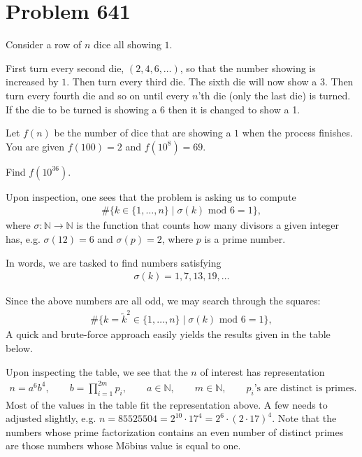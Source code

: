 \documentclass[main.tex]{subfiles}
\begin{document}
 
\section{Problem 641}

\begin{mdframed}[backgroundcolor = lightgray!10]
Consider a row of $n$ dice all showing $1$.

First turn every second die, $(2, 4, 6, \dots)$, so that the number showing is increased by $1$. Then turn every third die. The sixth die will now show a $3$. Then turn every fourth die and so on until every $n$'th die (only the last die) is turned. If the die to be turned is showing a 6 then it is changed to show a 1.

Let $f(n)$ be the number of dice that are showing a $1$ when the process finishes. You are given $f(100) = 2$ and $f(10^8) = 69$.


Find $f(10^{36})$.
\end{mdframed}

Upon inspection, one sees that the problem is asking us to compute
%
\begin{align}
 \# \{ k \in \{1, \dots, n \} \mid
 \sigma(k) \text{ mod } 6 = 1\},
\end{align}
%
where $\sigma: \mathbb N \to \mathbb N$ is the function that counts how many divisors a given integer has, e.g. $\sigma(12) = 6$ and $\sigma(p) = 2$, where $p$ is a prime number. 

In words, we are tasked to find numbers satisfying 
%
\begin{align}
 \sigma(k) = 1, 7, 13, 19, \dots
\end{align}

Since the above numbers are all odd, we may search through the squares:
%
\begin{align}
 \# \{ k = \widetilde k^2 \in \{1, \dots, n \} \mid
 \sigma(k) \text{ mod } 6 = 1\},
\end{align}
%
A quick and brute-force approach easily yields the results given in the table below. 

Upon inspecting the table, we see that the $n$ of interest has representation
%
\begin{align}
 n = a^6 b^4,
 \qquad b = \prod_{i=1}^{2m} p_i,
 \qquad a \in \mathbb N,
 \qquad m \in \mathbb N,
 \qquad p_i\text{'s are distinct is primes}.
\end{align}
%
Most of the values in the table fit the representation above. A few needs to adjusted slightly, e.g. $n = 85525504 = 2^{10} \cdot 17^4 = 2^6 \cdot (2 \cdot 17)^4$. Note that the numbers whose prime factorization contains an even number of distinct primes are those numbers whose M\"{o}bius value is equal to one. 
\end{document}

